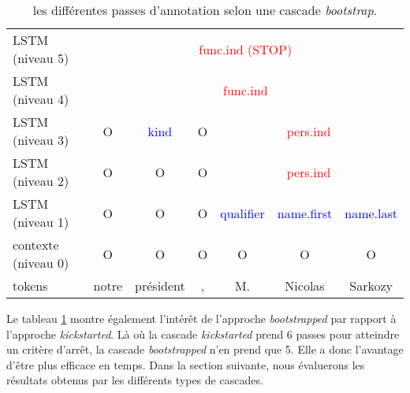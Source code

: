 \documentclass[PhD-Yoann-Dupont.tex]{subfiles}
\begin{document}
\begin{table}[ht!]
    \centering
    \begin{tabular}{|l|cccccc|}
    \hline
    LSTM (niveau 5)     & \multicolumn{6}{c|}{\textcolor{red}{func.ind (STOP)}} \\
    \cline{2-7}
    LSTM (niveau 4)     & \multicolumn{6}{c|}{\textcolor{red}{func.ind}} \\
    \cline{2-7}
    LSTM (niveau 3)     & O & \multicolumn{1}{|c|}{\textcolor{blue}{kind}} & O & \multicolumn{3}{|c|}{\textcolor{red}{pers.ind}} \\
    \cline{3-3}\cline{5-7}
    LSTM (niveau 2)     & O & O & O & \multicolumn{3}{|c|}{\textcolor{red}{pers.ind}} \\
    \cline{5-7}
    LSTM (niveau 1)     & O & O & O & \multicolumn{1}{|c|}{\textcolor{blue}{qualifier}} & \multicolumn{1}{c|}{\textcolor{blue}{name.first}} & \multicolumn{1}{c|}{\textcolor{blue}{name.last}} \\
    \cline{5-7}
    contexte (niveau 0) & O & O & O & O & O & O \\
    \hline
    tokens                & notre & président & , & M. & Nicolas & Sarkozy \\
    \hline
    \end{tabular}
    \caption{les différentes passes d'annotation selon une cascade \textit{bootstrap}.}
    \label{tab:bootstrap-annotations}
\end{table}

Le tableau \ref{tab:bootstrap-annotations} montre également l'intérêt de l'approche \textit{bootstrapped} par rapport à l'approche \textit{kickstarted}. Là où la cascade \textit{kickstarted} prend 6 passes pour atteindre un critère d'arrêt, la cascade \textit{bootstrapped} n'en prend que 5. Elle a donc l'avantage d'être plus efficace en temps. Dans la section suivante, nous évaluerons les résultats obtenus par les différents types de cascades.
\end{document}
